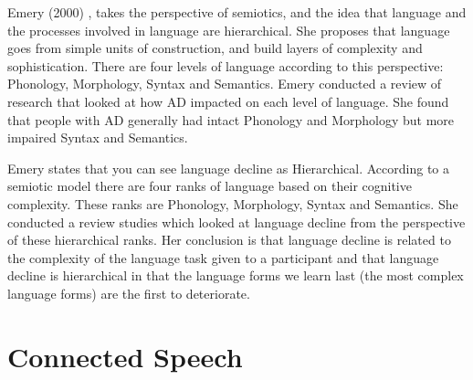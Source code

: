 \documentclass[a4paper]{article}
\begin{document}
Emery (2000)  \cite{Emery2000}, takes the perspective of semiotics, and the idea that language and the processes involved in language are hierarchical. She proposes that language goes from simple units of construction, and build layers of complexity and sophistication. There are four levels of language according to this perspective: Phonology, Morphology, Syntax and Semantics. Emery conducted a review of research that looked at how AD impacted on each level of language. She found that people with AD generally had intact Phonology and Morphology but more impaired Syntax and Semantics. 	 

Emery states that you can see language decline as Hierarchical. According to a semiotic model there are four ranks of language based on their cognitive complexity. These ranks are Phonology, Morphology, Syntax and Semantics. She conducted a review studies which looked at language decline from the perspective of these hierarchical ranks. Her conclusion is that language decline is related to the complexity of the language task given to a participant and that language decline is hierarchical in that the language forms we learn last (the most complex language forms) are the first to deteriorate.

\section{Connected Speech}
\end{document}
